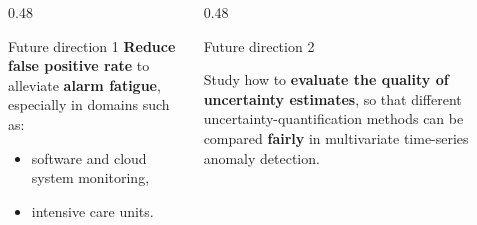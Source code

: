 \documentclass[aspectratio=169]{beamer}
\begin{document}
\begin{frame}
\begin{columns}[T,onlytextwidth]
\begin{column}{0.48\textwidth}
\begin{exampleblock}{Future direction 1}
                \textbf{Reduce false positive rate}
                to alleviate
                \textbf{alarm fatigue},
                especially in domains such as:
                \begin{itemize}
                    \setlength{\itemsep}{0.1em}
                    \item software and cloud system monitoring,
                    \item intensive care units.
                \end{itemize}

                \vspace{-0.35em}
            \end{exampleblock}
        \end{column}

        \begin{column}{0.48\textwidth}
            \begin{exampleblock}{Future direction 2}
                \scriptsize
                \vspace{-0.35em}

                Study how to
                \textbf{evaluate the quality of uncertainty estimates},
                so that different uncertainty-quantification methods
                can be compared
                \textbf{fairly}
                in multivariate time-series anomaly detection.

                \vspace{-0.35em}
            \end{exampleblock}
        \end{column}

    \end{columns}

\end{frame}



\end{document}
